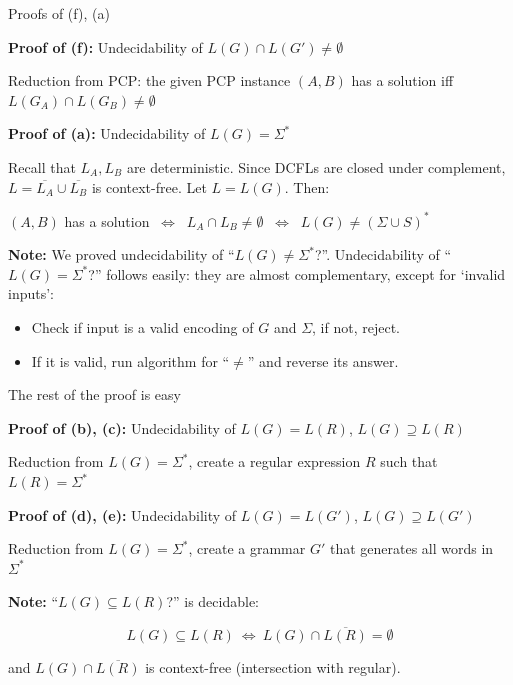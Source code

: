\documentclass[handout]{beamer}
\begin{document}
\begin{frame}{Proofs of (f), (a)} 

    \textbf{Proof of (f):} Undecidability of $L(G)\cap L(G')\neq\emptyset$

    \alert{Reduction from PCP:} the given PCP instance $(A,B)$ has a solution iff $L(G_A)\cap L(G_B)\neq\emptyset$\hfill\qedsymbol

    \textbf{Proof of (a):} Undecidability of $L(G)=\Sigma^*$

    Recall that $L_A,L_B$ are \alert{deterministic}. Since DCFLs are closed under complement, $L=\overline{L_A}\cup\overline{L_B}$ is context-free. Let $L=L(G)$. Then:
    
    \begin{center}
        $(A,B)$ has a solution $\ \Leftrightarrow\ $ $L_A\cap L_B\neq\emptyset$ $\ \Leftrightarrow\ $ $L(G)\neq(\Sigma\cup S)^*$\hfill\qedsymbol
    \end{center}

    \textbf{Note:} We proved undecidability of ``$L(G)\neq\Sigma^*$?''. Undecidability of ``$L(G)=\Sigma^*$?'' follows easily: they are almost complementary, except for `invalid inputs':
    \begin{itemize}
        \item Check if input is a valid encoding of $G$ and $\Sigma$, if not, reject.
        \item If it is valid, run algorithm for ``$\neq$'' and reverse its answer.
    \end{itemize}

\end{frame}


\begin{frame}{The rest of the proof is easy}
    
    \textbf{Proof of (b), (c):} Undecidability of $L(G)=L(R)$, $L(G)\supseteq L(R)$

    \alert{Reduction from $L(G)=\Sigma^*$}, create a regular expression $R$ such that $L(R)=\Sigma^*$

    \bigskip

    \textbf{Proof of (d), (e):} Undecidability of $L(G)= L(G')$, $L(G)\supseteq L(G')$

    \alert{Reduction from $L(G)=\Sigma^*$}, create a grammar $G'$ that generates all words in $\Sigma^*$
    \hfill\qedsymbol

    \bigskip

    \textbf{Note:} ``$L(G)\subseteq L(R)$?'' is decidable: 
    
    \vspace{-12pt}
    $$
    L(G)\subseteq L(R)\ \Leftrightarrow\ L(G)\cap \overline{L(R)}=\emptyset
    $$  

    and $L(G)\cap \overline{L(R)}$ is context-free (intersection with regular).

\end{frame}
\end{document}
